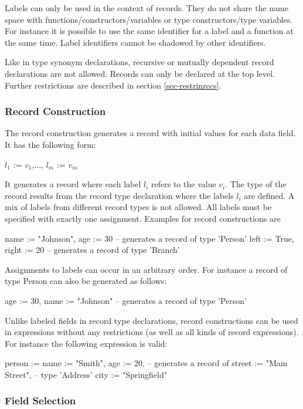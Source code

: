 \documentclass[11pt,fleqn]{article}
\renewcommand{\tt}{\usefont{OT1}{cmtt}{m}{n}\selectfont}
\newcommand{\codefont}{\small\tt}
\newcommand{\code}[1]{\mbox{\codefont #1}}
\begin{document}
Labels can only be used in the context of
records. They do not share the name space with 
functions/constructors/variables or type constructors/type variables. 
For instance it is possible to use 
the same identifier for a label and a function at the same time. Label
identifiers cannot be shadowed by other identifiers.

Like in type synonym declarations, recursive or mutually 
dependent record declarations are not allowed. Records can only
be declared at the top level. Further restrictions are described in
section \ref{sec-restrinrecs}.


\subsubsection{Record Construction}
\label{sec-recordconstr}

The record construction generates a record with initial values for
each data field. It has the following form:
\begin{curry}
{ $l_1$ := $v_1$,$\ldots$, $l_m$ := $v_m$ }
\end{curry}
It generates a record where each label $l_i$ refers to the
value $v_i$. The type of the record results from the record type
declaration where the labels $l_i$ are defined.
A mix of labels from different
record types is not allowed. All labels must be specified with 
exactly one assignment. Examples for record constructions are
\begin{curry}
{name := "Johnson", age := 30}     -- generates a record of type 'Person'
{left := True, right := 20}        -- generates a record of type 'Branch'
\end{curry}
Assignments to labels can occur in an arbitrary order. For instance a
record of type \code{Person} can also be generated as follows:
\begin{curry}
{age := 30, name := "Johnson"}     -- generates a record of type 'Person'
\end{curry}
Unlike labeled fields in record type declarations, 
record constructions can be used in expressions without any restrictions
(as well as all kinds of record expressions). For instance the following
expression is valid:
\begin{curry}
{person := {name := "Smith", age := 20},   -- generates a record of
 street := "Main Street",                  -- type 'Address'
 city   := "Springfield"}
\end{curry}


\subsubsection{Field Selection}
\label{sec-fieldsel}
\end{document}
